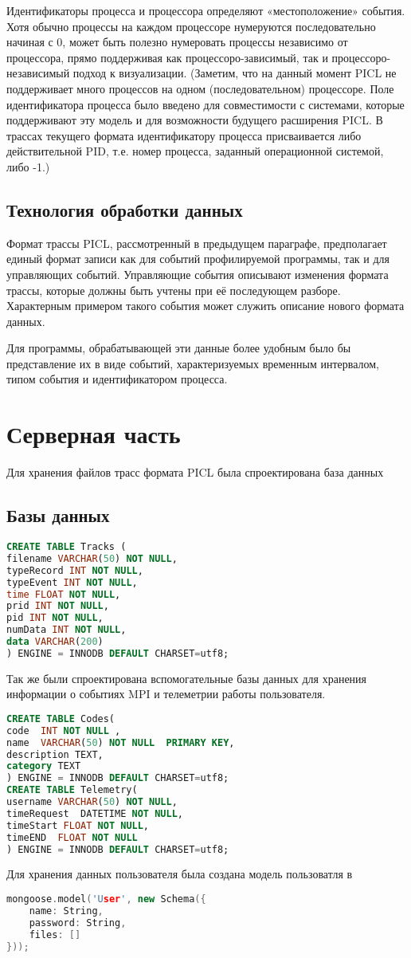 Идентификаторы процесса и процессора определяют «местоположение» события. Хотя обычно процессы на каждом процессоре нумеруются последовательно начиная с 0, может быть полезно нумеровать процессы независимо от процессора, прямо поддерживая как процессоро-зависимый, так и процессоро-независимый подход к визуализации. (Заметим, что на данный момент PICL не поддерживает много процессов на одном (последовательном) процессоре. Поле идентификатора процесса было введено для совместимости с системами, которые поддерживают эту модель и для возможности будущего расширения PICL. В трассах текущего формата идентификатору процесса присваивается либо действительной PID, т.е. номер процесса, заданный операционной системой, либо -1.)
\subsection{Технология обработки данных}
Формат трассы PICL, рассмотренный в предыдущем параграфе, предполагает единый формат записи как для событий профилируемой программы, так и для управляющих событий. Управляющие события описывают изменения формата трассы, которые должны быть учтены при её последующем разборе. Характерным примером такого события может служить описание нового формата данных.

Для программы, обрабатывающей эти данные более удобным было бы представление их в виде событий, характеризуемых временным интервалом, типом события и идентификатором процесса.
\section{Серверная часть}
Для хранения файлов трасс формата PICL была спроектирована база данных
\subsection{Базы данных}
\begin{lstlisting}[language=SQL]
CREATE TABLE Tracks ( 
filename VARCHAR(50) NOT NULL,
typeRecord INT NOT NULL,
typeEvent INT NOT NULL,
time FLOAT NOT NULL,
prid INT NOT NULL,
pid INT NOT NULL,
numData INT NOT NULL,
data VARCHAR(200)
) ENGINE = INNODB DEFAULT CHARSET=utf8;
\end{lstlisting}
Так же были спроектирована вспомогательные базы данных для хранения информации о событиях MPI и телеметрии работы пользователя.
\begin{lstlisting}[language=SQL]
CREATE TABLE Codes(
code  INT NOT NULL ,
name  VARCHAR(50) NOT NULL  PRIMARY KEY,
description TEXT,
category TEXT
) ENGINE = INNODB DEFAULT CHARSET=utf8;
CREATE TABLE Telemetry(
username VARCHAR(50) NOT NULL,
timeRequest  DATETIME NOT NULL,
timeStart FLOAT NOT NULL,
timeEND  FLOAT NOT NULL
) ENGINE = INNODB DEFAULT CHARSET=utf8;
\end{lstlisting} 
Для хранения данных пользователя была создана модель пользоватля в 
\begin{lstlisting}[language=c++]
mongoose.model('User', new Schema({ 
    name: String, 
    password: String, 
    files: []
}));
\end{lstlisting} 
